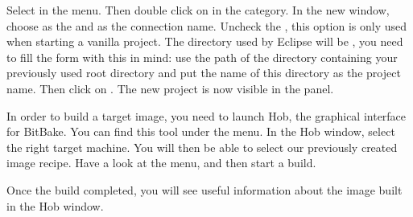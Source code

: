 Select  in the  menu. Then double click on  in the  category. In the new
window, choose  as the  and
 as the connection name. Uncheck the , this option is only used when starting a
vanilla project. The directory used by Eclipse will be , you need to fill the form with this in mind: use the path of the
directory containing your previously used  root directory and put
the name of this directory as the project name. Then click on .
The new project is now visible in the  panel.

In order to build a target image, you need to launch Hob, the graphical
interface for BitBake. You can find this tool under the  menu. In
the Hob window, select the right target machine. You will then be able to select
our previously created image recipe. Have a look at the  menu, and then start a build.

Once the build completed, you will see useful information about the image built
in the Hob window.
